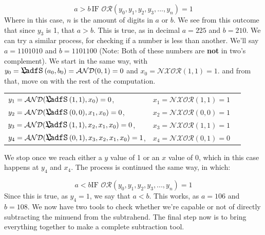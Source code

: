 \documentclass[oneside]{book}
\begin{document}
$$
a > b\,\mathrm{IF}\,\,\mathcal{OR}(y_0,y_1,y_2,y_3,...,y_n)=1
$$
\tab
Where in this case, $n$ is the amount of digits in $a$ or $b$. We see from this outcome that since $y_3$ is 1, that $a>b$. This is true, as in decimal $a=225$ and $b=210$.
\newline
\tab
We can try a similar process, for checking if a number is less than another. We'll say $a=1101010$ and $b=1101100$ (Note: Both of these numbers are \textbf{not} in two's complement). We start in the same way, with $y_0=\LessThan(a_0,b_0)=\mathcal{AND}(0,1)=0$ and $x_0=\mathcal{NXOR}(1,1)=1$. and from that, move on with the rest of the computation.
\begin{center}
\begin{tabular}{l c c}
$y_1 = \mathcal{AND}(\LessThan(1,1),x_0) = 0$, & $x_1 = \mathcal{NXOR}(1,1)=1$\\

$y_2 = \mathcal{AND}(\LessThan(0,0),x_1,x_0) = 0$, & $x_2 = \mathcal{NXOR}(0,0)=1$ \\

$y_3 = \mathcal{AND}(\LessThan(1,1),x_2,x_1,x_0) = 0$, & $x_3 = \mathcal{NXOR}(1,1)=1$ \\

$y_4 = \mathcal{AND}(\LessThan(0,1),x_3,x_2,x_1,x_0) = 1$, & $x_4 = \mathcal{NXOR}(0,1)=0$
\end{tabular}
\end{center}
\tab
We stop once we reach either a $y$ value of 1 or an $x$ value of 0, which in this case happens at $y_4$ and $x_4$. The process is continued the same way, in which:

$$
a < b \mathrm{IF}\,\, \mathcal{OR}(y_0,y_1,y_2,y_3,...,y_n) = 1
$$
\tab
Since this is true, as $y_4=1$, we say that $a<b$. This works, as $a=106$ and $b=108$. We now have two tools to check whether we're capable or not of directly subtracting the minuend from the subtrahend. The final step now is to bring everything together to make a complete subtraction tool.
\end{document}
